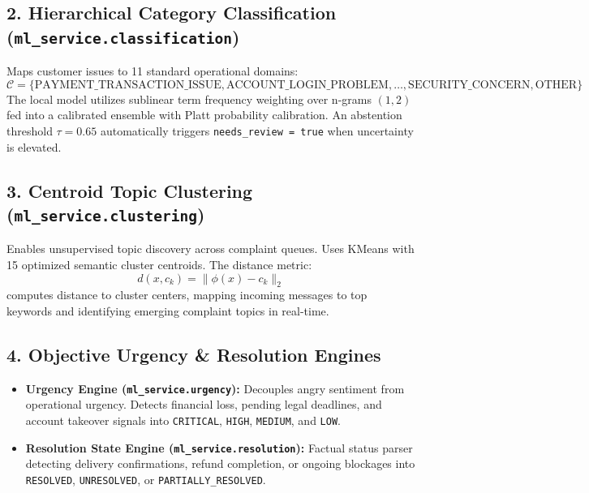 \documentclass[11pt,a4paper]{article}
\begin{document}
\subsection{2. Hierarchical Category Classification (\texttt{ml\_service.classification})}
Maps customer issues to 11 standard operational domains:
\begin{equation}
    \mathcal{C} = \{\text{PAYMENT\_TRANSACTION\_ISSUE}, \text{ACCOUNT\_LOGIN\_PROBLEM}, \dots, \text{SECURITY\_CONCERN}, \text{OTHER}\}
\end{equation}
The local model utilizes sublinear term frequency weighting over n-grams $(1, 2)$ fed into a calibrated ensemble with Platt probability calibration. An abstention threshold $\tau = 0.65$ automatically triggers \texttt{needs\_review = true} when uncertainty is elevated.

\subsection{3. Centroid Topic Clustering (\texttt{ml\_service.clustering})}
Enables unsupervised topic discovery across complaint queues. Uses KMeans with 15 optimized semantic cluster centroids. The distance metric:
\begin{equation}
    d(x, c_k) = \| \phi(x) - c_k \|_2
\end{equation}
computes distance to cluster centers, mapping incoming messages to top keywords and identifying emerging complaint topics in real-time.

\subsection{4. Objective Urgency \& Resolution Engines}
\begin{itemize}[leftmargin=*]
    \item \textbf{Urgency Engine (\texttt{ml\_service.urgency}):} Decouples angry sentiment from operational urgency. Detects financial loss, pending legal deadlines, and account takeover signals into \texttt{CRITICAL}, \texttt{HIGH}, \texttt{MEDIUM}, and \texttt{LOW}.
    \item \textbf{Resolution State Engine (\texttt{ml\_service.resolution}):} Factual status parser detecting delivery confirmations, refund completion, or ongoing blockages into \texttt{RESOLVED}, \texttt{UNRESOLVED}, or \texttt{PARTIALLY\_RESOLVED}.
\end{itemize}
\end{document}
